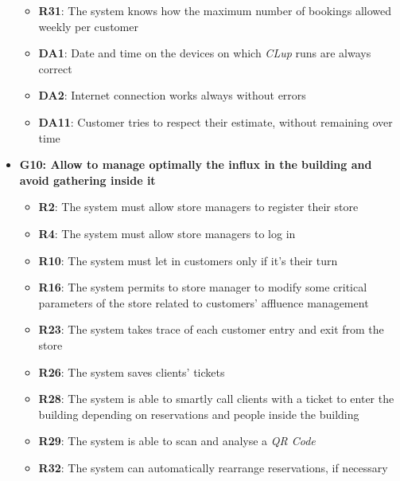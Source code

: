 \documentclass{article}
\begin{document}
\begin{itemize}
\begin{itemize}
						\item {\bfseries R31}: The system knows how the maximum number of bookings allowed weekly per customer\\
						
						\item {\bfseries DA1}: Date and time on the devices on which \emph{CLup} runs are always correct
						\item {\bfseries DA2}: Internet connection works always without errors
						\item{\bfseries DA11}: Customer tries to respect their estimate, without remaining over time
					
					\end{itemize}
				
				\item {\bfseries G10: Allow to manage optimally the influx in the building and avoid gathering inside it}	

					\begin{itemize}
						\item {\bfseries R2}: The system must allow store managers to register their store
						\item {\bfseries R4}: The system must allow store managers to log in
											
						\item {\bfseries R10}: The system must let in customers only if it's their turn
						\item {\bfseries R16}: The system permits to store manager to modify some critical parameters of the store related to customers' affluence management
						\item {\bfseries R23}: The system takes trace of each customer entry and exit from the store
						\item {\bfseries R26}: The system saves clients' tickets				
						\item {\bfseries R28}: The system is able to smartly call clients with a ticket to enter the building depending on reservations and people inside the building
						\item {\bfseries R29}: The system is able to scan and analyse a \emph{QR Code}
						\item{\bfseries R32}: The system can automatically rearrange reservations, if necessary \\
		

\end{itemize}
\end{itemize}
\end{document}
